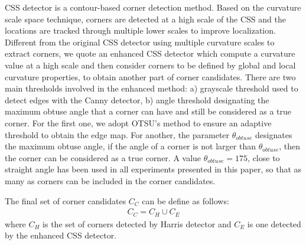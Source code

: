\documentclass[letterpaper, 10 pt, conference]{ieeeconf}  %
\begin{document}
CSS detector is a contour-based corner detection method. Based on the curvature scale space technique, corners are detected at a high scale of the CSS and the locations are tracked through multiple lower scales to improve localization. Different from the original CSS detector using multiple curvature scales to extract corners, we quote an enhanced CSS detector \cite{He2008Corner} which compute a curvature value at a high scale and then consider corners to be defined by global and local curvature properties, to obtain another part of corner candidates. There are two main thresholds involved in the enhanced method: a) grayscale threshold used to detect edges with the Canny detector, b) angle threshold designating the maximum obtuse angle that a corner can have and still be considered as a true corner. For the first one, we adopt OTSU's method \cite{Ohtsu1979A} to ensure an adaptive threshold to obtain the edge map. For another, the parameter ${\theta _ {obtuse}}$ designates the maximum obtuse angle, if the angle of a corner is not larger than ${\theta _ {obtuse}}$, then the corner can be considered as a true corner. A value ${\theta _ {obtuse} = 175}$, close to straight angle has been used in all experiments presented in this paper, so that as many as corners can be included in the corner candidates. 

The final set of corner candidates ${C_{C}}$ can be define as follows: 
\begin{equation}
\begin{split}
C _ { C } = C _ { H } \cup C _ { E }
\end{split}
\label{corner candidates}
\end{equation}
where ${C_{H}}$ is the set of corners detected by Harris detector and ${C_{E}}$ is one detected by the enhanced CSS detector. 
\end{document}

